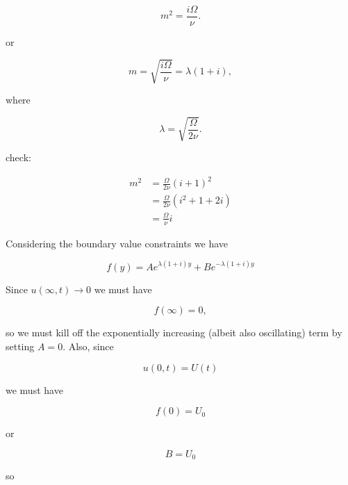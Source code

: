 \begin{equation}\label{eqn:continuumL17:380}
m^2 = \frac{i \Omega}{\nu}.
\end{equation}

or

\begin{equation}\label{eqn:continuumL17:400}
m = \sqrt{\frac{i \Omega}{\nu}} = \lambda (1 + i),
\end{equation}

where

\begin{equation}\label{eqn:continuumL17:420}
\lambda = \sqrt{\frac{\Omega}{2 \nu}}.
\end{equation}

check:

\begin{align*}
m^2 
&= 
\frac{\Omega}{2 \nu} (i + 1)^2 \\
&= 
\frac{\Omega}{2 \nu} (i^2 + 1 + 2 i) \\
&= 
\frac{\Omega}{\nu} i
\end{align*}

Considering the boundary value constraints we have

\begin{equation}\label{eqn:continuumL17:440}
f(y) = 
A e^{\lambda (1 + i) y}
+ B e^{-\lambda (1 + i) y}
\end{equation}

Since $u(\infty, t) \rightarrow 0$ we must have

\begin{equation}\label{eqn:continuumL17:460}
f(\infty) = 0,
\end{equation}

so we must kill off the exponentially increasing (albeit also oscillating) term by setting $A = 0$.  Also, since

\begin{equation}\label{eqn:continuumL17:480}
u(0, t) = U(t)
\end{equation}

we must have

\begin{equation}\label{eqn:continuumL17:500}
f(0) = U_0
\end{equation}

or 

\begin{equation}\label{eqn:continuumL17:520}
B = U_0
\end{equation}

so 

